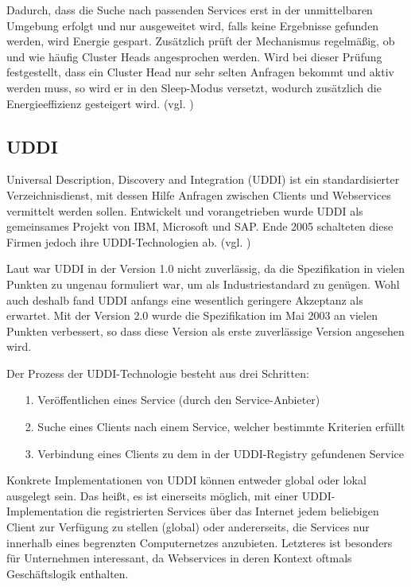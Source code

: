 \documentclass[conference,compsoc]{IEEEtran}
\begin{document}
Dadurch, dass die Suche nach passenden Services erst in der unmittelbaren Umgebung erfolgt und nur ausgeweitet wird, falls keine Ergebnisse gefunden werden, wird Energie gespart. Zusätzlich prüft der Mechanismus regelmäßig, ob und wie häufig Cluster Heads angesprochen werden. Wird bei dieser Prüfung festgestellt, dass ein Cluster Head nur sehr selten Anfragen bekommt und aktiv werden muss, so wird er in den Sleep-Modus versetzt, wodurch zusätzlich die Energieeffizienz gesteigert wird. (vgl. \cite{energy-efficient})

\subsection{UDDI}

Universal Description, Discovery and Integration (UDDI) ist ein standardisierter Verzeichnisdienst, mit dessen Hilfe Anfragen zwischen Clients und Webservices vermittelt werden sollen. Entwickelt und vorangetrieben wurde UDDI als gemeinsames Projekt von IBM, Microsoft und SAP. Ende 2005 schalteten diese Firmen jedoch ihre UDDI-Technologien ab. (vgl. \cite{UDDI-Variability})

Laut \cite{UDDI-Variability} war UDDI in der Version 1.0 nicht zuverlässig, da die Spezifikation in vielen Punkten zu ungenau formuliert war, um als Industriestandard zu genügen. Wohl auch deshalb fand UDDI anfangs eine wesentlich geringere Akzeptanz als erwartet. Mit der Version 2.0 wurde die Spezifikation im Mai 2003 an vielen Punkten verbessert, so dass diese Version als erste zuverlässige Version angesehen wird.

Der Prozess der UDDI-Technologie besteht aus drei Schritten:
\begin{itemize}
\item[1.] Veröffentlichen eines Service (durch den Service-Anbieter)
\item[2.] Suche eines Clients nach einem Service, welcher bestimmte Kriterien erfüllt
\item[3.] Verbindung eines Clients zu dem in der UDDI-Registry gefundenen Service
\end{itemize}

Konkrete Implementationen von UDDI können entweder global oder lokal ausgelegt sein. Das heißt, es ist einerseits möglich, mit einer UDDI-Implementation die registrierten Services über das Internet jedem beliebigen Client zur Verfügung zu stellen (global) oder andererseits, die Services nur innerhalb eines begrenzten Computernetzes anzubieten. Letzteres ist besonders für Unternehmen interessant, da Webservices in deren Kontext oftmals Geschäftslogik enthalten.
\end{document}
